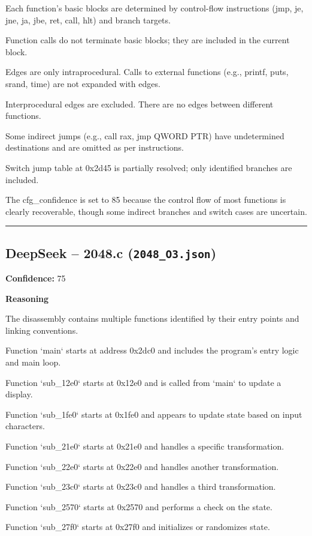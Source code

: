 Each function's basic blocks are determined by control-flow instructions (jmp, je, jne, ja, jbe, ret, call, hlt) and branch targets.

Function calls do not terminate basic blocks; they are included in the current block.

Edges are only intraprocedural. Calls to external functions (e.g., printf, puts, srand, time) are not expanded with edges.

Interprocedural edges are excluded. There are no edges between different functions.

Some indirect jumps (e.g., call rax, jmp QWORD PTR) have undetermined destinations and are omitted as per instructions.

Switch jump table at 0x2d45 is partially resolved; only identified branches are included.

The cfg\_confidence is set to 85 because the control flow of most functions is clearly recoverable, though some indirect branches and switch cases are uncertain.

\bigskip
\hrule
\bigskip

\subsection{DeepSeek -- 2048.c (\texttt{2048\_O3.json})}

\textbf{Confidence:} 75

\textbf{Reasoning}

The disassembly contains multiple functions identified by their entry points and linking conventions.

Function `main` starts at address 0x2dc0 and includes the program's entry logic and main loop.

Function `sub\_12e0` starts at 0x12e0 and is called from `main` to update a display.

Function `sub\_1fe0` starts at 0x1fe0 and appears to update state based on input characters.

Function `sub\_21e0` starts at 0x21e0 and handles a specific transformation.

Function `sub\_22e0` starts at 0x22e0 and handles another transformation.

Function `sub\_23c0` starts at 0x23c0 and handles a third transformation.

Function `sub\_2570` starts at 0x2570 and performs a check on the state.

Function `sub\_27f0` starts at 0x27f0 and initializes or randomizes state.

